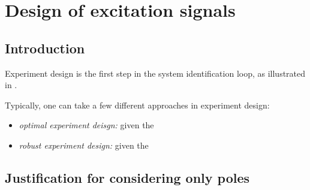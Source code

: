 \chapter{Design of excitation signals}
\def\thisDir{ch02-qlogms}

\section{Introduction}
\label{sec:excitation:intro}
Experiment design is the first step in the system identification loop, as illustrated in .


Typically, one can take a few different approaches in experiment design:
\begin{itemize}
  \item \emph{optimal experiment deisgn:} given the 
  \item \emph{robust experiment design:} given the 
\end{itemize}






\section{}
\section{}
\subsection{}
\subsection{}
\subsection{}
\subsection{}
\subsection{}



\begin{subappendices}
  \section{Justification for considering only poles}

\end{subappendices}


